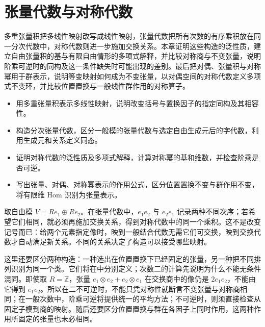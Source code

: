
\chapter{张量代数与对称代数}
\label{b2:ch:08}

\begin{chapterabstract}
	多重张量积把多线性映射改写成线性映射，张量代数把所有次数的有序乘积放在同一分次代数中，对称代数则进一步施加交换关系。本章证明这些构造的泛性质，建立自由张量积的基与有限自由情形的多项式解释，并比较对称商与不变张量，说明阶乘可逆时的同构及这一条件缺失时可能出现的差别。最后把对偶、张量积与对称幂用于群表示，说明等变映射如何成为不变张量，以对偶空间的对称代数定义多项式不变环，并比较位置置换与一般线性群作用的对称算子。
\end{chapterabstract}

\begin{learninggoals}
	\begin{itemize}
		\item 用多重张量积表示多线性映射，说明改变括号与置换因子的指定同构及其相容性。
		\item 构造分次张量代数，区分一般模的张量代数与选定自由生成元后的字代数，利用生成元和关系定义同态。
		\item 证明对称代数的泛性质及多项式解释，计算对称幂的基和维数，并检查阶乘是否可逆。
		\item 写出张量、对偶、对称幂表示的作用公式，区分位置置换不变与群作用不变，将有限维 Hom 识别为张量表示。
	\end{itemize}
\end{learninggoals}

取自由模 \(V=Re_1\oplus Re_2\)。在张量代数中，\(e_1e_2\) 与 \(e_2e_1\) 记录两种不同次序；若希望它们相同，就必须再施加交换关系，得到对称代数中的同一个乘积。这不是改变记号而已：给两个元素指定像时，映到一般结合代数无需它们可交换，映到交换代数才自动满足新关系。不同的关系决定了构造可以接受哪些映射。

\ProseParagraphBreak

这里还要区分两种构造：一种选出在位置置换下已经固定的张量，另一种把不同排列识别为同一个类。它们将在中分别定义；次数二的计算先说明为什么不能无条件混同。即使取 \(R=\mathbb Z\)，张量 \(e_1\otimes e_2+e_2\otimes e_1\) 在交换商中的像仍是 \(2e_1e_2\)，不能由它得到 \(e_1e_2\)。所以在二不可逆时，不能只凭对称性就断言不变张量与对称商相同；在一般次数中，阶乘可逆将提供统一的平均方法；不可逆时，则须直接检查从固定子模到商的映射。随后还要区分位置置换与群在各因子上同时作用，这两种作用所固定的张量也未必相同。

